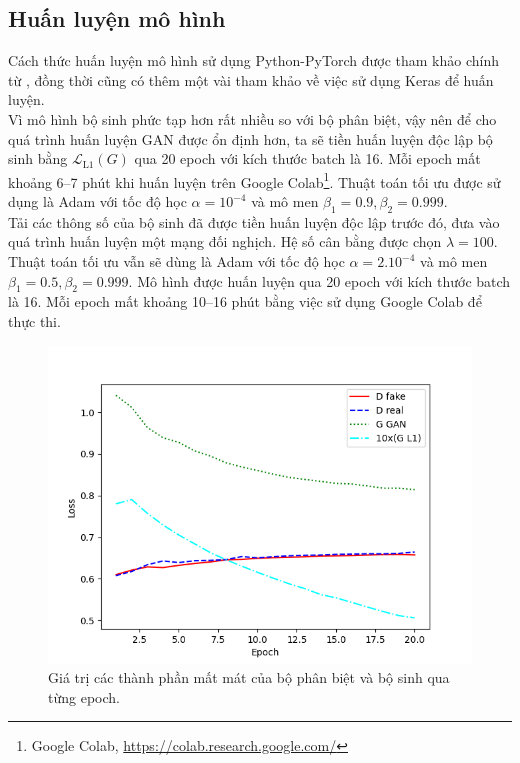 \documentclass[a4paper, 12pt]{article}
\begin{document}
\subsection{Huấn luyện mô hình}
Cách thức huấn luyện mô hình sử dụng Python-PyTorch được tham khảo chính từ \cite{aladdinperssonyoutube, moeincolorization2020}, đồng thời cũng có thêm một vài tham khảo về việc sử dụng Keras \cite{tuannguyenpix2pix2020, khanhpix2pix2020, jasonpix2pix2019} để huấn luyện.\vspace{5pt}\\
Vì mô hình bộ sinh phức tạp hơn rất nhiều so với bộ phân biệt, vậy nên để cho quá trình huấn luyện GAN được ổn định hơn, ta sẽ tiền huấn luyện \cite{ham2020unbalanced} độc lập bộ sinh bằng $\mathcal{L}_{\text{L1}}(G)$ qua 20 epoch với kích thước batch là 16. Mỗi epoch mất khoảng 6--7 phút khi huấn luyện trên Google Colab\footnote{Google Colab, \href{https://colab.research.google.com/}{https://colab.research.google.com/}}. Thuật toán tối ưu được sử dụng là Adam \cite{kingma2017adam} với tốc độ học $\alpha = 10^{-4}$ và mô men $\beta_1 = 0.9, \beta_2=0.999$.\vspace{5pt}\\
Tải các thông số của bộ sinh đã được tiền huấn luyện độc lập trước đó, đưa vào quá trình huấn luyện một mạng đối nghịch. Hệ số cân bằng được chọn $\lambda=100$. Thuật toán tối ưu vẫn sẽ dùng là Adam với tốc độ học $\alpha=2.10^{-4}$ và mô men $\beta_1 = 0.5, \beta_2=0.999$. Mô hình được huấn luyện qua 20 epoch với kích thước batch là 16. Mỗi epoch mất khoảng 10--16 phút bằng việc sử dụng Google Colab để thực thi.

\begin{figure}[!h]
\captionsetup{width=0.8\textwidth}
\centering
\includegraphics[width=14cm]{images/3_6.png}
\caption{Giá trị các thành phần mất mát của bộ phân biệt và bộ sinh qua từng epoch.}
\end{figure}
\end{document}
